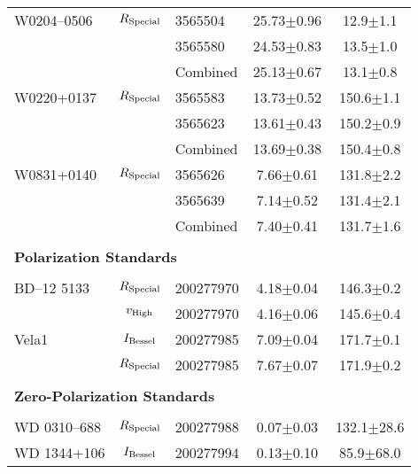 \begin{table}
\begin{tabular}{lclcc}
        W0204--0506  & $R_{\rm Special}$ & 3565504   &           25.73$\pm$0.96 & \phantom{0}12.9$\pm$1.1 \\
                     &                   & 3565580   &           24.53$\pm$0.83 & \phantom{0}13.5$\pm$1.0 \\
                     &                   & Combined  &           25.13$\pm$0.67 & \phantom{0}13.1$\pm$0.8 \\
        W0220+0137   & $R_{\rm Special}$ & 3565583   &           13.73$\pm$0.52 &           150.6$\pm$1.1 \\
                     &                   & 3565623   &           13.61$\pm$0.43 &           150.2$\pm$0.9 \\
                     &                   & Combined  &           13.69$\pm$0.38 &           150.4$\pm$0.8 \\
        W0831+0140   & $R_{\rm Special}$ & 3565626   & \phantom{0}7.66$\pm$0.61 &           131.8$\pm$2.2 \\
                     &                   & 3565639   & \phantom{0}7.14$\pm$0.52 &           131.4$\pm$2.1 \\
                     &                   & Combined  & \phantom{0}7.40$\pm$0.41 &           131.7$\pm$1.6 \\
        \\
        \multicolumn{5}{l}{\bf{Polarization Standards}}\\\\
        BD--12 5133  & $R_{\rm Special}$ & 200277970 & \phantom{0}4.18$\pm$0.04 &           146.3$\pm$0.2 \\
                     & $v_{\rm High}$    & 200277970 & \phantom{0}4.16$\pm$0.06 &           145.6$\pm$0.4 \\
        Vela1        & $I_{\rm Bessel}$  & 200277985 & \phantom{0}7.09$\pm$0.04 &           171.7$\pm$0.1 \\
                     & $R_{\rm Special}$ & 200277985 & \phantom{0}7.67$\pm$0.07 &           171.9$\pm$0.2 \\
        \\
        \multicolumn{5}{l}{\bf{Zero-Polarization Standards}}\\\\
        WD 0310--688 & $R_{\rm Special}$ & 200277988 & \phantom{0}0.07$\pm$0.03 &          132.1$\pm$28.6 \\
        WD 1344+106  & $I_{\rm Bessel}$  & 200277994 & \phantom{0}0.13$\pm$0.10 & \phantom{0}85.9$\pm$68.0 \\

\end{tabular}
\end{table}
